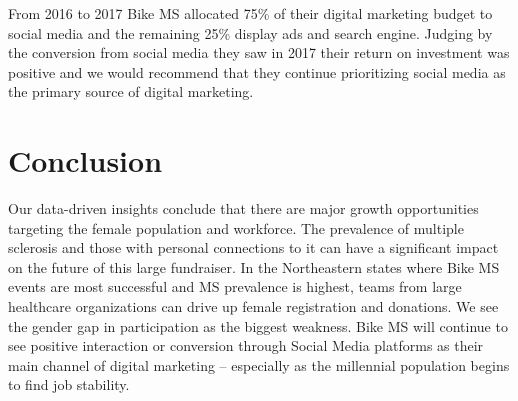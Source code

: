 \documentclass[]{article}
\begin{document}
From 2016 to 2017 Bike MS allocated 75\% of their digital marketing
budget to social media and the remaining 25\% display ads and search
engine. Judging by the conversion from social media they saw in 2017
their return on investment was positive and we would recommend that they
continue prioritizing social media as the primary source of digital
marketing.

\hypertarget{conclusion}{%
\section{Conclusion}\label{conclusion}}

Our data-driven insights conclude that there are major growth
opportunities targeting the female population and workforce. The
prevalence of multiple sclerosis and those with personal connections to
it can have a significant impact on the future of this large fundraiser.
In the Northeastern states where Bike MS events are most successful and
MS prevalence is highest, teams from large healthcare organizations can
drive up female registration and donations. We see the gender gap in
participation as the biggest weakness. Bike MS will continue to see
positive interaction or conversion through Social Media platforms as
their main channel of digital marketing -- especially as the millennial
population begins to find job stability.
\end{document}
